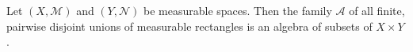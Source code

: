 Let $(X, \mathcal{M})$ and $(Y, \mathcal{N})$ be measurable spaces. Then the family $\mathcal{A}$ of all finite, pairwise disjoint unions of measurable rectangles is an algebra of subsets of $X \times Y$.